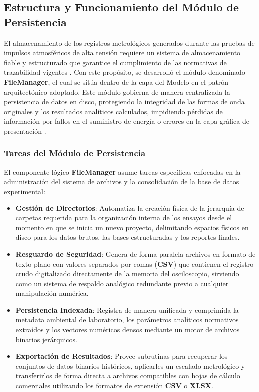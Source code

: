 \subsection{Estructura y Funcionamiento del Módulo de Persistencia}
\label{subsec:modulo_persistencia}

El almacenamiento de los registros metrológicos generados durante las pruebas de impulsos atmosféricos de alta tensión requiere un sistema de almacenamiento fiable y estructurado que garantice el cumplimiento de las normativas de trazabilidad vigentes \cite{iec60060_1}. Con este propósito, se desarrolló el módulo denominado \textbf{FileManager}, el cual se sitúa dentro de la capa del Modelo en el patrón arquitectónico adoptado. Este módulo gobierna de manera centralizada la persistencia de datos en disco, protegiendo la integridad de las formas de onda originales y los resultados analíticos calculados, impidiendo pérdidas de información por fallos en el suministro de energía o errores en la capa gráfica de presentación \cite{iec61083_2}.

\subsubsection{Tareas del Módulo de Persistencia}
\label{subsubsec:tareas_persistencia}

El componente lógico \textbf{FileManager} asume tareas específicas enfocadas en la administración del sistema de archivos y la consolidación de la base de datos experimental:
\begin{itemize}
    \item \textbf{Gestión de Directorios}: Automatiza la creación física de la jerarquía de carpetas requerida para la organización interna de los ensayos desde el momento en que se inicia un nuevo proyecto, delimitando espacios físicos en disco para los datos brutos, las bases estructuradas y los reportes finales.
    \item \textbf{Resguardo de Seguridad}: Genera de forma paralela archivos en formato de texto plano con valores separados por comas (\textbf{CSV}) que contienen el registro crudo digitalizado directamente de la memoria del osciloscopio, sirviendo como un sistema de respaldo analógico redundante previo a cualquier manipulación numérica.
    \item \textbf{Persistencia Indexada}: Registra de manera unificada y comprimida la metadata ambiental de laboratorio, los parámetros analíticos normativos extraídos y los vectores numéricos densos mediante un motor de archivos binarios jerárquicos.
    \item \textbf{Exportación de Resultados}: Provee subrutinas para recuperar los conjuntos de datos binarios históricos, aplicarles un escalado metrológico y transferirlos de forma directa a archivos compatibles con hojas de cálculo comerciales utilizando los formatos de extensión \textbf{CSV} o \textbf{XLSX}.
\end{itemize}

